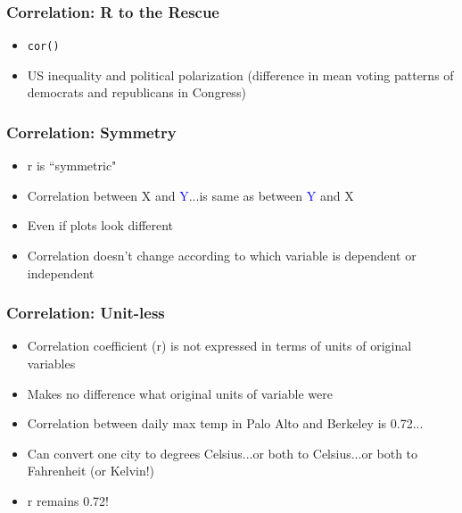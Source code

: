 \documentclass{beamer}
\newcommand{\blue}{\textcolor{blue}}
\begin{document}
\begin{frame}
 \frametitle<+->{Correlation: R to the Rescue}
 \begin{itemize}[<+->]
   \item {\tt cor()}
   \item US inequality and political polarization (difference in mean voting patterns of democrats and republicans in Congress)
 \end{itemize}
\end{frame}

\begin{frame}
 \frametitle<+->{Correlation: Symmetry}
 \begin{itemize}[<+->]
   \item r is ``symmetric"
   \item Correlation between \alert{X} and \blue{Y}...is same as between \blue{Y} and \alert{X}
   \item Even if plots look different
   \item Correlation doesn't change according to which  variable is dependent  or independent
 \end{itemize}
 \vspace{-.2cm}
 \begin{center}
 \end{center}
\end{frame}

\begin{frame}
 \frametitle<+->{Correlation: Unit-less}
 \begin{minipage}{.3\linewidth}
 \begin{itemize}[<+->]
   \item Correlation coefficient (r) is not expressed in terms of units of original variables
   \bigskip
   \item Makes no difference what original units of variable were
 \end{itemize}
 \end{minipage}\hfill
 \begin{minipage}{.65\linewidth}
 \begin{itemize}[<+->]
       \item Correlation between daily max temp in Palo Alto and Berkeley is 0.72...
       \item Can convert one city to degrees Celsius...or both to Celsius...or both to Fahrenheit (or Kelvin!)
       \item r remains 0.72!
 \end{itemize}
  \begin{center}
 \end{center}
 \end{minipage}
\end{frame}
\end{document}
